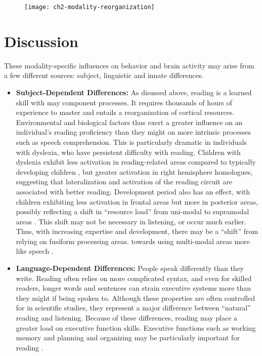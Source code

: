 \begin{figure}[b]
	\centering
	\texttt{[image: ch2-modality-reorganization]}
    \caption[Reading decreases connectivity within visual and dorsal attention networks.]{}
	\label{fig:ch2-modality-reorganization}
\end{figure}


\section{Discussion}



These modality-specific influences on behavior and brain activity may arise from a few different sources: subject, linguistic and innate differences. 

\begin{itemize}
	\item \textbf{Subject-Dependent Differences:} As disussed above, reading is a learned skill with may component processes. It requires thousands of hours of experience to master and entails a reorganization of cortical resources. Environmental and biological factors thus exert a greater influence on an individual’s reading proficiency than they might on more intrinsic processes such as speech comprehension. This is particularly dramatic in individuals with dyslexia, who have persistent difficulty with reading. Children with dyslexia exhibit less activation in reading-related areas compared to typically developing children \cite{Pugh2000}, but greater activation in right hemisphere homologues, suggesting that lateralization and activation of the reading circuit are associated with better reading. Development period also has an effect, with children exhibiting less activation in frontal areas but more in posterior areas, possibly reflecting a shift in “resource load” from uni-modal to supramodal areas \cite{Berl2010}. This shift may not be necessary in listening, or occur much earlier. Thus, with increasing expertise and development, there may be a “shift” from relying on fusiform processing areas. towards using multi-modal areas more like speech \cite{Monzalvo}. 

	\item \textbf{Language-Dependent Differences:} People speak differently than they write. Reading often relies on more complicated syntax, and even for skilled readers, longer words and sentences can strain executive systems more than they might if being spoken to. Although these properties are often controlled for in scientific studies, they represent a major difference between “natural” reading and listening. Because of these differences, reading may place a greater load on executive function skills. Executive functions such as working memory and planning and organizing may be particularly important for reading \cite{Cain}.  
	

\end{itemize}
